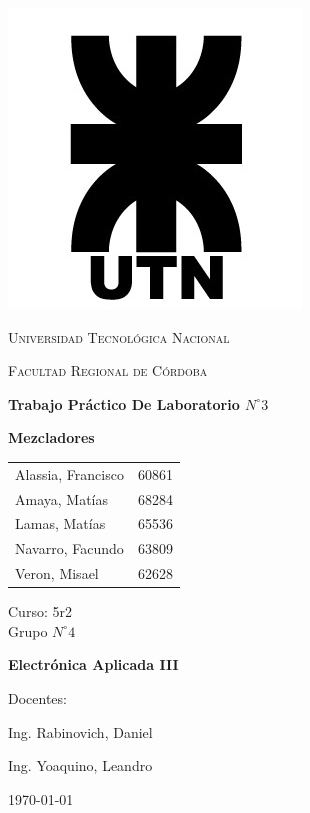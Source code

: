 \documentclass[twocolumn]{article}
\begin{document}
\begin{titlepage}
 \centering
	\includegraphics[scale=0.80]{imagenes/LOGO.jpg} \par
 	\vspace{1cm}
 	{\scshape\LARGE Universidad Tecnológica Nacional \par}
 	{\scshape\large Facultad Regional de Córdoba \par}
 	\vspace{1cm}
	{\bfseries \Large Trabajo Práctico De Laboratorio $N^{\circ} 3$\par}
	{\bfseries \Large Mezcladores \par}
 	\vspace{1.5cm}

	\begin{tabular}{ll}
		Alassia, Francisco	&	60861	\\
		Amaya, Matías		&	68284	\\
		Lamas, Matías 		&	65536 	\\
		Navarro, Facundo 	&	63809 	\\
		Veron, Misael	 	&	62628
	\end{tabular}
	
	\vspace{1cm}
	Curso: 5r2 \\
	Grupo $N^{\circ} 4$
 	\vfill
	{\bfseries \Large Electrónica Aplicada III \par}

	\vspace{1.5cm}
	Docentes: \par
	Ing. Rabinovich, Daniel \par
	Ing. Yoaquino, Leandro \par

 	\vfill
	{\large \today\par}
\end{titlepage}
\end{document}
